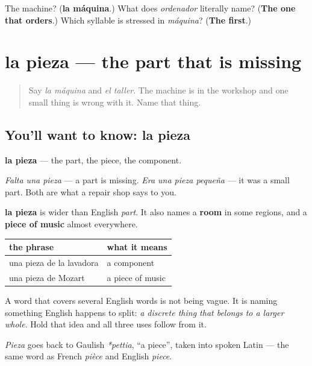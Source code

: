 \begin{tcolorbox}[breakable,colback=teal!4,colframe=teal!35!black,title={Before you move on}]
The machine? (\textbf{la máquina}.) What does \emph{ordenador} literally name? (\textbf{The one that orders}.) Which syllable is stressed in \emph{máquina}? (\textbf{The first}.)
\end{tcolorbox}
\section[la pieza]{la pieza — the part that is missing}

\label{lesson:ES-C434-pieza}



\begin{quote}
Say \emph{la máquina} and \emph{el taller}. The machine is in the workshop and one small thing is wrong with it. Name that thing.
\end{quote}

\subsection*{You'll want to know: la pieza}
\textbf{la pieza} — the part, the piece, the component.

\emph{Falta una pieza} — a part is missing. \emph{Era una pieza pequeña} — it was a small part. Both are what a repair shop says to you.

\begin{cousinweb}
\textbf{la pieza} is wider than English \emph{part}. It also names a \textbf{room} in some regions, and a \textbf{piece of music} almost everywhere.

\noindent
\begin{tabularx}{\linewidth}{@{}>{\raggedright\arraybackslash}X>{\raggedright\arraybackslash}X@{}}
\toprule
\textbf{the phrase} & \textbf{what it means} \\
\midrule
una pieza de la lavadora & a component \\
una pieza de Mozart & a piece of music \\
\bottomrule
\end{tabularx}

A word that covers several English words is not being vague. It is naming something English happens to split: \emph{a discrete thing that belongs to a larger whole}. Hold that idea and all three uses follow from it.

\emph{Pieza} goes back to Gaulish \emph{*pettia}, \textquotedblleft{}a piece\textquotedblright{}, taken into spoken Latin — the same word as French \emph{pièce} and English \emph{piece}.
\end{cousinweb}

